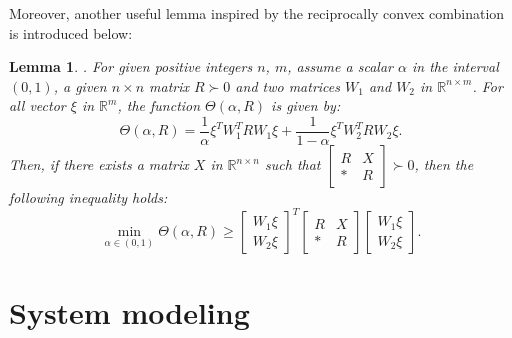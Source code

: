 \documentclass[a4paper]{cas-sc}
\newtheorem{lemma}[theorem]{Lemma}
\begin{document}
Moreover, another useful lemma inspired by the reciprocally convex combination is introduced below:
\begin{lemma}
  \label{lemma2}
  \citep{park_reciprocally_2011}. For given positive integers $n$, $m$, assume a scalar $\alpha$ in the interval $ (0,1) $, a given $ n \times n $ matrix $ R \succ 0 $ and two matrices $W_1$ and $W_2$ in $ {\mathbb{R}^{n \times m}} $. For all vector $\xi$ in $ {\mathbb{R}^m} $, the function $ \Theta (\alpha ,R) $ is given by:
  \begin{equation}
    \Theta (\alpha ,R) = \frac{1}{\alpha }{\xi ^T}W_1^TR{W_1}\xi  + \frac{1}{{1 - \alpha }}{\xi ^T}W_2^TR{W_2}\xi.
    \label{eqlemma21}
  \end{equation}
  Then, if there exists a matrix $X$ in $ {\mathbb{R}^{n \times n}} $ such that $ \left[ {\begin{array}{*{20}{l}}
            R & X \\
            * & R
          \end{array}} \right] \succ 0 $, then the following inequality holds:
  \begin{equation}
    \mathop {\min }\limits_{\alpha  \in (0,1)} \Theta (\alpha ,R) \geqslant {\left[ {\begin{array}{*{20}{l}}
              {{W_1}\xi } \\
              {{W_2}\xi }
            \end{array}} \right]^T}\left[ {\begin{array}{*{20}{c}}
            R & X \\
            * & R
          \end{array}} \right]\left[ {\begin{array}{*{20}{l}}
            {{W_1}\xi } \\
            {{W_2}\xi }
          \end{array}} \right].
    \label{eqlemma22}
  \end{equation}
\end{lemma}



\section{System modeling}
\label{Section 3}
\end{document}

